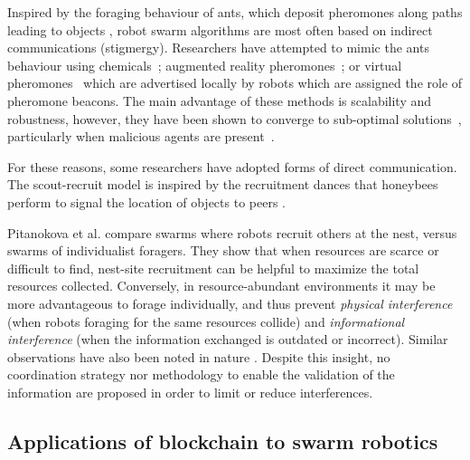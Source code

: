 \documentclass[runningheads]{llncs}
\begin{document}
Inspired by the foraging behaviour of ants, which deposit pheromones along paths leading to objects \cite{deneubourg_ants_1990}, robot swarm algorithms are most often based on indirect communications (stigmergy). Researchers have attempted to mimic the ants behaviour using chemicals~\cite{salman_phormica_2020}; augmented reality pheromones~\cite{font_llenas_pheromones_2018}; or virtual pheromones~\cite{campo_artificial_2010,hoff_distributed_2013} which are advertised locally by robots which are assigned the role of pheromone beacons. The main advantage of these methods is scalability and robustness, however, they have been shown to converge to sub-optimal solutions~\cite{missing}, particularly when malicious agents are present~\cite{pincy_hacking_2022}.

For these reasons, some researchers have adopted forms of direct communication. The scout-recruit model is inspired by the recruitment dances that honeybees perform to signal the location of objects to peers \cite{seeley_bees_1983,biesmeijer_exploration_2001}.


 Pitanokova et al. \cite{pitonakova_understanding_2014,pitonakova_icr_2018} compare swarms where robots recruit others at the nest, versus swarms of individualist foragers. They show that when resources are scarce or difficult to find, nest-site recruitment can be helpful to maximize the total resources collected. Conversely, in resource-abundant environments it may be more advantageous to forage individually, and thus prevent \emph{physical interference} (when robots foraging for the same resources collide) and \emph{informational interference} (when the information exchanged is outdated or incorrect). Similar observations have also been noted in nature \cite{wilson_sociobiology_2000}. Despite this insight, no coordination strategy nor methodology to enable the validation of the information are proposed in order to limit or reduce interferences.

\subsection{Applications of blockchain to swarm robotics}
\label{sec:blockchain-applications}
\end{document}
